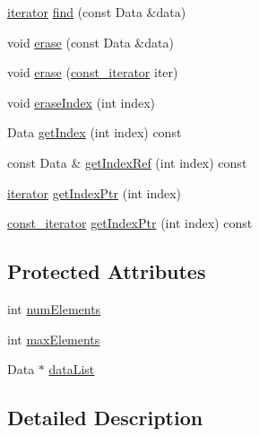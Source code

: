\begin{CompactItemize}
\item 
\hyperlink{class_j_g_t_l_1_1_set_interface_1f4b953e9a9adb5d463b6abb24623372}{iterator} \hyperlink{class_j_g_t_l_1_1_set_interface_fef4fa91516c191180d9854eb2cc4f9a}{find} (const Data \&data)
\item 
void \hyperlink{class_j_g_t_l_1_1_set_interface_13066581738f291b78b56d20022dfd2a}{erase} (const Data \&data)
\item 
void \hyperlink{class_j_g_t_l_1_1_set_interface_63afc2fbaf7a446bcbf5b082aab99a27}{erase} (\hyperlink{class_j_g_t_l_1_1_set_interface_1e545e77790db36de24904dc70054225}{const\_\-iterator} iter)
\item 
void \hyperlink{class_j_g_t_l_1_1_set_interface_9ac2a0584d9ba0cf45d4591949d72ed6}{erase\-Index} (int index)
\item 
Data \hyperlink{class_j_g_t_l_1_1_set_interface_26e49dd3a87be1ec6a5961711e0324be}{get\-Index} (int index) const
\item 
const Data \& \hyperlink{class_j_g_t_l_1_1_set_interface_2e19833f67c42d4b83b26ae61f9bfb0c}{get\-Index\-Ref} (int index) const
\item 
\hyperlink{class_j_g_t_l_1_1_set_interface_1f4b953e9a9adb5d463b6abb24623372}{iterator} \hyperlink{class_j_g_t_l_1_1_set_interface_a55fad0448297a2946f29cf3e3915af7}{get\-Index\-Ptr} (int index)
\item 
\hyperlink{class_j_g_t_l_1_1_set_interface_1e545e77790db36de24904dc70054225}{const\_\-iterator} \hyperlink{class_j_g_t_l_1_1_set_interface_acf7a261d06754d70004ed676c90d4e9}{get\-Index\-Ptr} (int index) const
\end{CompactItemize}
\subsection*{Protected Attributes}
\begin{CompactItemize}
\item 
int \hyperlink{class_j_g_t_l_1_1_set_interface_3c8282b939324cb187d18825105433fa}{num\-Elements}
\item 
int \hyperlink{class_j_g_t_l_1_1_set_interface_df4c40ad8cc969a8c3b11a93d8bb25c2}{max\-Elements}
\item 
Data $\ast$ \hyperlink{class_j_g_t_l_1_1_set_interface_67a7d6bcf8d20f0eeb668daad040bd86}{data\-List}
\end{CompactItemize}


\subsection{Detailed Description}
